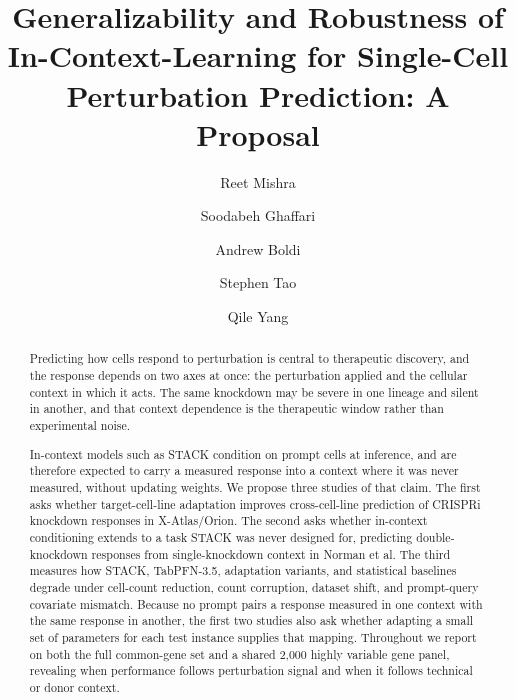 \documentclass[times, twoside, watermark]{zHenriquesLab-StyleBioRxiv}
\begin{document}
\title{Generalizability and Robustness of In-Context-Learning for Single-Cell Perturbation Prediction: A Proposal}

\author[1, 2]{Reet Mishra}
\author[1, 2]{Soodabeh Ghaffari}
\author[1]{Andrew Boldi}
\author[1]{Stephen Tao}
\author[1]{Qile Yang}


\maketitle


\begin{abstract}
Predicting how cells respond to perturbation is central to therapeutic discovery, and the response depends on two axes at once: the perturbation applied and the cellular context in which it acts. The same knockdown may be severe in one lineage and silent in another, and that context dependence is the therapeutic window rather than experimental noise.

In-context models such as STACK condition on prompt cells at inference, and are therefore expected to carry a measured response into a context where it was never measured, without updating weights. We propose three studies of that claim. The first asks whether target-cell-line adaptation improves cross-cell-line prediction of CRISPRi knockdown responses in X-Atlas/Orion. The second asks whether in-context conditioning extends to a task STACK was never designed for, predicting double-knockdown responses from single-knockdown context in Norman et al. The third measures how STACK, TabPFN-3.5, adaptation variants, and statistical baselines degrade under cell-count reduction, count corruption, dataset shift, and prompt-query covariate mismatch. Because no prompt pairs a response measured in one context with the same response in another, the first two studies also ask whether adapting a small set of parameters for each test instance supplies that mapping. Throughout we report on both the full common-gene set and a shared 2,000 highly variable gene panel, revealing when performance follows perturbation signal and when it follows technical or donor context.
\end{abstract}

\end{document}
